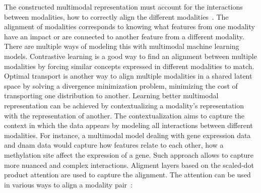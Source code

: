 \documentclass[../main.tex]{subfiles}
\begin{document}
	The constructed multimodal representation must account for the interactions between modalities, \ie{}how to correctly align the different modalities~\cite{MML_morency}.
	The alignment of modalities corresponds to knowing what features from one modality have an impact or are connected to another feature from a different modality.
	There are multiple ways of modeling this with multimodal machine learning models.
	Contrastive learning is a good way to find an alignment between multiple modalities by forcing similar concepts expressed in different modalities to match.
	Optimal transport is another way to align multiple modalities in a shared latent space by solving a divergence minimization problem, \ie{}minimizing the cost of transporting one distribution to another.
	Learning better multimodal representation can be achieved by contextualizing a modality's representation with the representation of another.
	The contextualization aims to capture the context in which the data appears by modeling all interactions between different modalities.
	For instance, a multimodal model dealing with gene expression data and \gls{dnam} data would capture how features relate to each other, \ie{}how a methylation site affect the expression of a gene.
	Such approach allows to capture more nuanced and complex interactions.
	Aligment layers based on the scaled-dot product attention are used to capture the alignment.
	The attention can be used in various ways to align a modality pair~\cite{Xu2023}:
\end{document}
